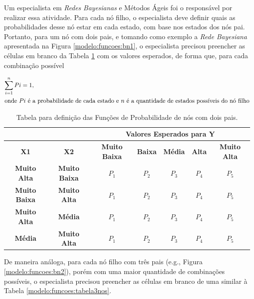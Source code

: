 Um especialista em \textit{Redes Bayesianas} e Métodos Ágeis foi o responsável por realizar essa atividade. Para cada nó filho, o especialista deve definir quais as probabilidades desse nó estar em cada estado, com base nos estados dos nós pai. Portanto, para um nó com dois pais, e tomando como exemplo a \textit{Rede Bayesiana} apresentada na Figura \ref{modelo:funcoes:bn1}, o especialista precisou preencher as células em branco da Tabela \ref{modelo:funcoes:tabela2nos} com os valores esperados, de forma que, para cada combinação possível

\begin{align}
  \sum_{i=1}^{n}Pi = 1,\\ \intertext{onde $Pi$ é a probabilidade de cada estado e $n$ é a quantidade de estados possíveis do nó filho}
\end{align}

\begin{table}[ht!]
\centering
\caption{Tabela para definição das Funções de Probabilidade de nós com dois pais.}
\label{modelo:funcoes:tabela2nos}
\begin{tabular}{|c|c|c|c|c|c|c|}
\hline
\multicolumn{2}{|l|}{}                      & \multicolumn{5}{c|}{\textbf{Valores Esperados para Y}}                                       \\ \hline
\textbf{X1}          & \textbf{X2}          & \textbf{Muito Baixa} & \textbf{Baixa} & \textbf{Média} & \textbf{Alta} & \textbf{Muito Alta} \\ \hline
\textbf{Muito Alta}  & \textbf{Muito Baixa} & $P_{1}$              & $P_{2}$        & $P_{3}$        & $P_{4}$       & $P_{5}$              \\ \hline
\textbf{Muito Baixa} & \textbf{Muito Alta}  & $P_{1}$              & $P_{2}$        & $P_{3}$        & $P_{4}$       & $P_{5}$             \\ \hline
\textbf{Muito Alta}  & \textbf{Média}       & $P_{1}$              & $P_{2}$        & $P_{3}$        & $P_{4}$       & $P_{5}$             \\ \hline
\textbf{Média}       & \textbf{Muito Alta}  & $P_{1}$              & $P_{2}$        & $P_{3}$        & $P_{4}$       & $P_{5}$             \\ \hline
\end{tabular}
\end{table}

De maneira análoga, para cada nó filho com três pais (e.g., Figura \ref{modelo:funcoes:bn2}), porém com uma maior quantidade de combinações possíveis, o especialista precisou preencher as células em branco de uma similar à Tabela \ref{modelo:funcoes:tabela3nos}.

